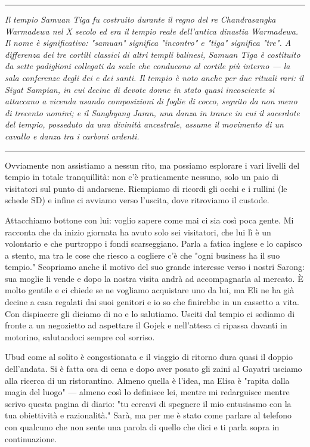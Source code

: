 \begin{center}
    \noindent\rule{0.6\textwidth}{0.4pt}
\end{center}

\textit{Il tempio Samuan Tiga fu costruito durante il regno del re Chandrasangka Warmadewa nel X secolo ed era il tempio reale dell'antica dinastia Warmadewa. Il nome è significativo: "samuan" significa "incontro" e "tiga" significa "tre". A differenza dei tre cortili classici di altri templi balinesi, Samuan Tiga è costituito da sette padiglioni collegati da scale che conducono al cortile più interno — la sala conferenze degli dei e dei santi. Il tempio è noto anche per due rituali rari: il Siyat Sampian, in cui decine di devote donne in stato quasi incosciente si attaccano a vicenda usando composizioni di foglie di cocco, seguito da non meno di trecento uomini; e il Sanghyang Jaran, una danza in trance in cui il sacerdote del tempio, posseduto da una divinità ancestrale, assume il movimento di un cavallo e danza tra i carboni ardenti.}

\begin{center}
    \noindent\rule{0.6\textwidth}{0.4pt}
\end{center}

Ovviamente non assistiamo a nessun rito, ma possiamo esplorare i vari livelli del tempio in totale tranquillità: non c'è praticamente nessuno, solo un paio di visitatori sul punto di andarsene. Riempiamo di ricordi gli occhi e i rullini (le schede SD) e infine ci avviamo verso l'uscita, dove ritroviamo il custode.

Attacchiamo bottone con lui: voglio sapere come mai ci sia così poca gente. Mi racconta che da inizio giornata ha avuto solo sei visitatori, che lui lì è un volontario e che purtroppo i fondi scarseggiano. Parla a fatica inglese e lo capisco a stento, ma tra le cose che riesco a cogliere c'è che "ogni business ha il suo tempio." Scopriamo anche il motivo del suo grande interesse verso i nostri Sarong: sua moglie li vende e dopo la nostra visita andrà ad accompagnarla al mercato. È molto gentile e ci chiede se ne vogliamo acquistare uno da lui, ma Eli ne ha già decine a casa regalati dai suoi genitori e io so che finirebbe in un cassetto a vita. Con dispiacere gli diciamo di no e lo salutiamo. Usciti dal tempio ci sediamo di fronte a un negozietto ad aspettare il Gojek e nell'attesa ci ripassa davanti in motorino, salutandoci sempre col sorriso.

Ubud come al solito è congestionata e il viaggio di ritorno dura quasi il doppio dell'andata. Si è fatta ora di cena e dopo aver posato gli zaini al Gayatri usciamo alla ricerca di un ristorantino. Almeno quella è l'idea, ma Elisa è "rapita dalla magia del luogo" — almeno così lo definisce lei, mentre mi redarguisce mentre scrivo questa pagina di diario: "tu cercavi di spegnere il mio entusiasmo con la tua obiettività e razionalità." Sarà, ma per me è stato come parlare al telefono con qualcuno che non sente una parola di quello che dici e ti parla sopra in continuazione.

